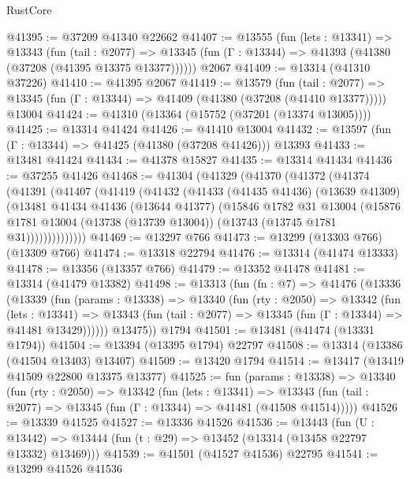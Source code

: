 \begin{lexlean}{RustCore}
\begin{coremodule}
@41395 := @37209 @41340 @22662
@41407 := @13555
    (fun (lets : @13341) =>
    @13343
      (fun (tail : @2077) =>
      @13345 (fun (Γ : @13344) => @41393 (@41380 (@37208 (@41395 @13375 @13377))))))
    @2067
@41409 := @13314 (@41310 @37226)
@41410 := @41395 @2067
@41419 := @13579
    (fun (tail : @2077) => @13345 (fun (Γ : @13344) => @41409 (@41380 (@37208 (@41410 @13377)))))
    @13004
@41424 := @41310 (@13364 (@15752 (@37201 (@13374 @13005))))
@41425 := @13314 @41424
@41426 := @41410 @13004
@41432 := @13597 (fun (Γ : @13344) => @41425 (@41380 (@37208 @41426))) @13393
@41433 := @13481 @41424
@41434 := @41378 @15827
@41435 := @13314 @41434
@41436 := @37255 @41426
@41468 := @41304
    (@41329
      (@41370
        (@41372
          (@41374
            (@41391
              (@41407
                (@41419
                  (@41432
                    (@41433
                      (@41435 @41436)
                      (@13639 @41309)
                      (@13481
                        @41434
                        @41436
                        (@13644 @41377)
                        (@15846
                          @1782
                          @31
                          @13004
                          (@15876
                            @1781
                            @13004
                            (@13738 (@13739 @13004))
                            (@13743 (@13745 @1781 @31))))))))))))))
@41469 := @13297 @766
@41473 := @13299 (@13303 @766) (@13309 @766)
@41474 := @13318 @22794
@41476 := @13314 (@41474 @13333)
@41478 := @13356 (@13357 @766)
@41479 := @13352 @41478
@41481 := @13314 (@41479 @13382)
@41498 := @13313
    (fun (fn : @7) =>
    @41476
      (@13336
        (@13339
          (fun (params : @13338) =>
          @13340
            (fun (rty : @2050) =>
            @13342
              (fun (lets : @13341) =>
              @13343 (fun (tail : @2077) => @13345 (fun (Γ : @13344) => @41481 @13429))))))
        @13475))
    @1794
@41501 := @13481 (@41474 (@13331 @1794))
@41504 := @13394 (@13395 @1794) @22797
@41508 := @13314 (@13386 (@41504 @13403) @13407)
@41509 := @13420 @1794
@41514 := @13417 (@13419 @41509 @22800 @13375 @13377)
@41525 := fun (params : @13338) =>
  @13340
    (fun (rty : @2050) =>
    @13342
      (fun (lets : @13341) =>
      @13343 (fun (tail : @2077) => @13345 (fun (Γ : @13344) => @41481 (@41508 @41514)))))
@41526 := @13339 @41525
@41527 := @13336 @41526
@41536 := @13443
    (fun (U : @13442) => @13444 (fun (t : @29) => @13452 (@13314 (@13458 @22797 @13332) @13469)))
@41539 := @41501 (@41527 @41536) @22795
@41541 := @13299 @41526 @41536

\end{coremodule}
\end{lexlean}
